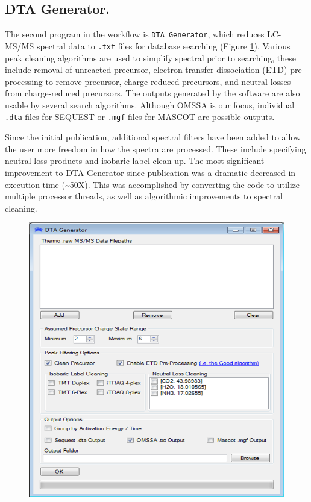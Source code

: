 \subsection*{DTA Generator.}
The second program in the \compass{} workflow is \texttt{DTA Generator}, which reduces LC-MS/MS spectral data to \texttt{.txt} files for database searching (Figure \ref{fig:dtagenerator}). Various peak cleaning algorithms are used to simplify spectral prior to searching, these include removal of unreacted precursor, electron-transfer dissociation (ETD) pre-processing to remove precursor, charge-reduced precursors, and neutral losses from charge-reduced precursors.\cite{good} The outputs generated by the software are also usable by several search algorithms. Although OMSSA is our focus, individual \texttt{.dta} files for SEQUEST or \texttt{.mgf} files for MASCOT are possible outputs.\cite{sequest,mascot}

Since the initial publication, additional spectral filters have been added to allow the user more freedom in how the spectra are processed. These include specifying neutral loss products and isobaric label clean up. The most significant improvement to DTA Generator since publication was a dramatic decreased in execution time (\textasciitilde50X). This was accomplished by converting the code to utilize multiple processor threads, as well as algorithmic improvements to spectral cleaning. 
\begin{figure}[p]
	\centering
	\includegraphics[width=0.8\columnwidth]{csmsl/dtagenerator.png}
	\label{fig:dtagenerator}
\end{figure}

